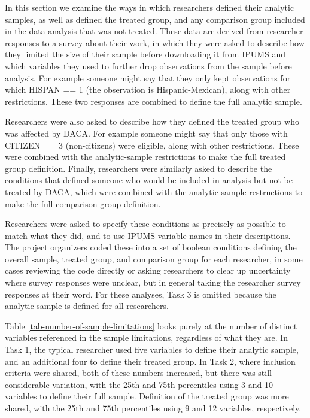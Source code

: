 \documentclass[
  letterpaper,
  DIV=11,
  numbers=noendperiod]{scrartcl}
\begin{document}
In this section we examine the ways in which researchers defined their
analytic samples, as well as defined the treated group, and any
comparison group included in the data analysis that was not treated.
These data are derived from researcher responses to a survey about their
work, in which they were asked to describe how they limited the size of
their sample before downloading it from IPUMS and which variables they
used to further drop observations from the sample before analysis. For
example someone might say that they only kept observations for which
HISPAN == 1 (the observation is Hispanic-Mexican), along with other
restrictions. These two responses are combined to define the full
analytic sample.

Researchers were also asked to describe how they defined the treated
group who was affected by DACA. For example someone might say that only
those with CITIZEN == 3 (non-citizens) were eligible, along with other
restrictions. These were combined with the analytic-sample restrictions
to make the full treated group definition. Finally, researchers were
similarly asked to describe the conditions that defined someone who
would be included in analysis but not be treated by DACA, which were
combined with the analytic-sample restructions to make the full
comparison group definition.

Researchers were asked to specify these conditions as precisely as
possible to match what they did, and to use IPUMS variable names in
their descriptions. The project organizers coded these into a set of
boolean conditions defining the overall sample, treated group, and
comparison group for each researcher, in some cases reviewing the code
directly or asking researchers to clear up uncertainty where survey
responses were unclear, but in general taking the researcher survey
responses at their word. For these analyses, Task 3 is omitted because
the analytic sample is defined for all researchers.

Table \ref{tab-number-of-sample-limitations} looks purely at the number
of distinct variables referenced in the sample limitations, regardless
of what they are. In Task 1, the typical researcher used five variables
to define their analytic sample, and an additional four to define their
treated group. In Task 2, where inclusion criteria were shared, both of
these numbers increased, but there was still considerable variation,
with the 25th and 75th percentiles using 3 and 10 variables to define
their full sample. Definition of the treated group was more shared, with
the 25th and 75th percentiles using 9 and 12 variables, respectively.
\end{document}
